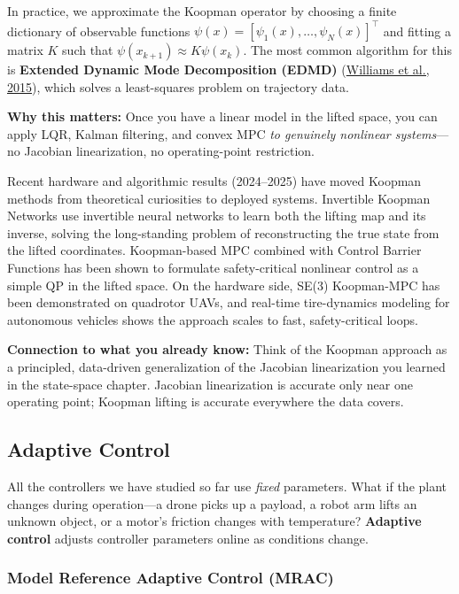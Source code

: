 In practice, we approximate the Koopman operator by choosing a finite dictionary of observable functions $\psi(x) = [\psi_1(x), \ldots, \psi_N(x)]^\top$ and fitting a matrix $K$ such that $\psi(x_{k+1}) \approx K \psi(x_k)$. The most common algorithm for this is \textbf{Extended Dynamic Mode Decomposition (EDMD)} (\href{https://arxiv.org/abs/1408.4408}{Williams et al., 2015}), which solves a least-squares problem on trajectory data.

\textbf{Why this matters:} Once you have a linear model in the lifted space, you can apply LQR, Kalman filtering, and convex MPC \emph{to genuinely nonlinear systems}---no Jacobian linearization, no operating-point restriction.

Recent hardware and algorithmic results (2024--2025) have moved Koopman methods from theoretical curiosities to deployed systems. Invertible Koopman Networks use invertible neural networks to learn both the lifting map and its inverse, solving the long-standing problem of reconstructing the true state from the lifted coordinates. Koopman-based MPC combined with Control Barrier Functions has been shown to formulate safety-critical nonlinear control as a simple QP in the lifted space. On the hardware side, SE(3) Koopman-MPC has been demonstrated on quadrotor UAVs, and real-time tire-dynamics modeling for autonomous vehicles shows the approach scales to fast, safety-critical loops.

\textbf{Connection to what you already know:} Think of the Koopman approach as a principled, data-driven generalization of the Jacobian linearization you learned in the state-space chapter. Jacobian linearization is accurate only near one operating point; Koopman lifting is accurate everywhere the data covers.

\subsection{Adaptive Control}

All the controllers we have studied so far use \emph{fixed} parameters. What if the plant changes during operation---a drone picks up a payload, a robot arm lifts an unknown object, or a motor's friction changes with temperature? \textbf{Adaptive control} adjusts controller parameters online as conditions change.

\subsubsection{Model Reference Adaptive Control (MRAC)}

